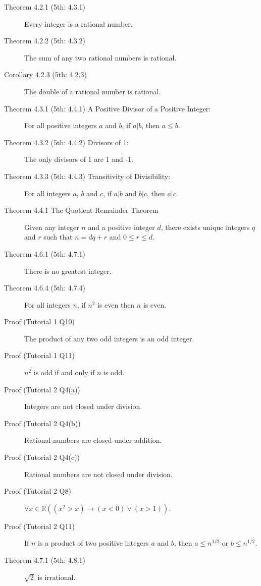 \documentclass{article}
\begin{document}
\begin{description}
    \item[Theorem 4.2.1 (5th: 4.3.1)] Every integer is a rational number.
    \item[Theorem 4.2.2 (5th: 4.3.2)] The sum of any two rational numbers is rational.
    \item[Corollary 4.2.3 (5th: 4.2.3)] The double of a rational number is rational.
    \item[Theorem 4.3.1 (5th: 4.4.1) A Positive Divisor of a Positive Integer:] For all positive integers $a$ and $b$, if $a|b$, then $a\leq b$. 
    \item[Theorem 4.3.2 (5th: 4.4.2) Divisors of 1:] The only divisors of 1 are 1 and -1.
    \item[Theorem 4.3.3 (5th: 4.4.3) Transitivity of Divisibility:] For all integers $a$, $b$ and $c$, if $a|b$ and $b|c$, then $a|c$. 
    \item[Theorem 4.4.1 The Quotient-Remainder Theorem]Given any integer $n$ and a positive integer $d$, there exists unique integers $q$ and $r$ such that $n=dq+r$ and $0\leq r\leq d$.
    \item[Theorem 4.6.1 (5th: 4.7.1)] There is no greatest integer.
    \item[Theorem 4.6.4 (5th: 4.7.4)] For all integers $n$, if $n^{2}$ is even then $n$ is even.
    \item[Proof (Tutorial 1 Q10)] The product of any two odd integers is an odd integer.
    \item[Proof (Tutorial 1 Q11)] $n^{2}$ is odd if and only if $n$ is odd.
    \item[Proof (Tutorial 2 Q4(a))]Integers are not closed under division.
    \item[Proof (Tutorial 2 Q4(b))]Rational numbers are closed under addition.
    \item[Proof (Tutorial 2 Q4(c))]Rational numbers are not closed under division.
    \item[Proof (Tutorial 2 Q8)]$\forall x\in \mathbb{R} ((x^{2}>x)\to (x<0)\lor(x>1))$.
    \item[Proof (Tutorial 2 Q11)]If $n$ is a product of two positive integers $a$ and $b$, then $a\leq n^{1/2}$ or $b\leq n^{1/2}$.
    \item[Theorem 4.7.1 (5th: 4.8.1)] $\sqrt{2}$ is irrational.
        

\end{description}
\end{document}
